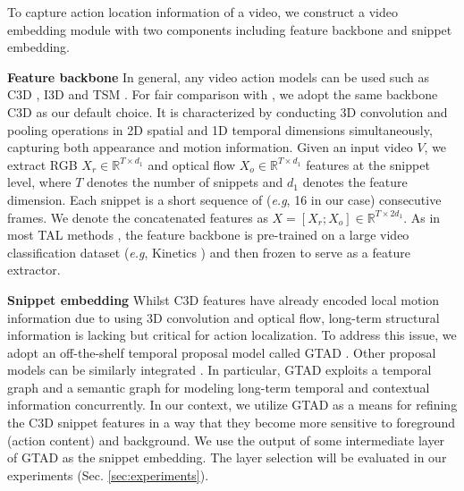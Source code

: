 \documentclass{bmvc2k}
\def\eg{\emph{e.g}\bmvaOneDot}
\begin{document}
To capture action location information of a video, we construct a video embedding module with two components including feature backbone and snippet embedding.

\noindent\textbf{Feature backbone } 
In general, any video action models can be used such as 
C3D \cite{tran2015learning}, I3D \cite{carreira2017quo} and TSM \cite{lin2019tsm}.
For fair comparison with \cite{yang2020localizing},
we adopt the same backbone C3D as our default choice.
It is characterized by conducting 3D convolution and pooling operations in 2D spatial and 1D temporal dimensions simultaneously, capturing both appearance and motion information.  
Given an input video $V$, 
we extract RGB $X_{r} \in \mathbb{R}^{T \times d_1}$ 
and 
optical flow $X_{o} \in \mathbb{R}^{T \times d_1}$
features at the snippet level,
where $T$ denotes the number of snippets and $d_1$ denotes the feature dimension.
Each snippet is a short sequence of (\eg, 16 in our case) consecutive frames. 
We denote the concatenated features as $X = [X_r; X_o] \in \mathbb{R}^{T \times 2d_1}$.
As in most TAL methods \cite{xu2020gtad,xu2017r,lin2019bmn},
the feature backbone is pre-trained on a large video classification
dataset (\eg, Kinetics \cite{kay2017kinetics}) and 
then frozen to serve as a feature extractor.


\noindent\textbf{Snippet embedding }
Whilst C3D features have already encoded local motion information
due to using 3D convolution and optical flow,
long-term structural information is lacking but
critical for action localization.
To address this issue, we adopt an off-the-shelf temporal proposal model called GTAD \cite{xu2020gtad}. Other proposal models can be similarly integrated \cite{lin2018bsn,lin2019bmn,xu2020gtad}.
In particular, GTAD exploits a temporal graph and a semantic graph
for modeling long-term temporal and contextual information concurrently.
In our context, we utilize GTAD as a means for refining the C3D snippet features in a way that they become more sensitive to foreground (action content) and background.
We use the output of some intermediate layer of GTAD
as the snippet embedding.
The layer selection will be evaluated in our experiments (Sec. \ref{sec:experiments}).
\end{document}
